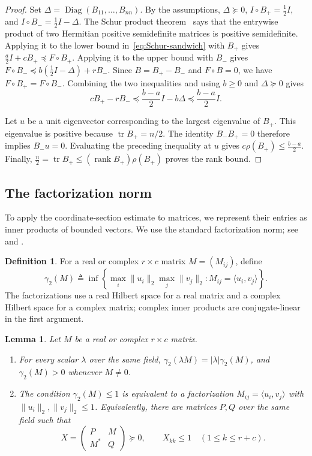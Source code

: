 \documentclass[11pt]{article}
\numberwithin{equation}{section}
\newtheorem{lemma}[theorem]{Lemma}
\theoremstyle{definition}
\newtheorem{definition}[theorem]{Definition}
\theoremstyle{remark}
\DeclareMathOperator{\tr}{tr}
\DeclareMathOperator{\rank}{rank}
\DeclareMathOperator{\Diag}{Diag}
\begin{document}
\begin{proof}
Set
$\Delta=\Diag(B_{11},\ldots,B_{nn})$.
By the assumptions,
$\Delta\succeq0$, $I\circ B_+=\frac12 I$, and $I\circ B_-=\frac12 I-\Delta$.
The Schur product theorem~\cite{Schur} says that the entrywise
product of two Hermitian positive semidefinite matrices is
positive semidefinite. Applying it to the lower bound
in~\eqref{eq:Schur-sandwich} with $B_+$ gives
$\frac a2 I+cB_+\preceq F\circ B_+$.
Applying it to the upper bound with $B_-$ gives
$F\circ B_-\preceq b\left(\frac12 I-\Delta\right)+rB_-$.
Since $B=B_+-B_-$ and $F\circ B=0$, we have
$F\circ B_+=F\circ B_-$.
Combining the two inequalities and using $b\geq0$ and $\Delta\succeq0$
gives
\[
 cB_+-rB_-
 \preceq \frac{b-a}{2}I-b\Delta
 \preceq \frac{b-a}{2}I.
\]

Let $u$ be a unit eigenvector corresponding to the largest
eigenvalue of $B_+$. This eigenvalue is positive because
$\tr B_+=n/2$.
The identity $B_-B_+=0$ therefore implies $B_-u=0$.
Evaluating the preceding inequality at $u$ gives
$c\rho(B_+)\leq\frac{b-a}{2}$.
Finally,
$\frac n2=\tr B_+ \leq(\rank B_+)\rho(B_+)$
proves the rank bound.
\end{proof}


\subsection{The factorization norm}\label{sec:factorization}

To apply the coordinate-section estimate to matrices, we represent
their entries as inner products of bounded vectors. We use the
standard factorization norm; see \cite[Section~2, equation~(2)]{SS05}
and \cite[Section~2.1]{LMSS}.

\begin{definition}\label{def:gamma-two}
For a real or complex $r\times c$ matrix $M=(M_{ij})$, define
\[
 \gamma_2(M)\triangleq \inf\left\{
  \max_i\|u_i\|_2\max_j\|v_j\|_2:
  M_{ij}=\langle u_i,v_j\rangle\right\}.
\]
The factorizations use a real Hilbert space for a real matrix and a
complex Hilbert space for a complex matrix; complex inner products
are conjugate-linear in the first argument.
\end{definition}

\begin{lemma}\label{lem:gamma-properties}
Let $M$ be a real or complex $r\times c$ matrix.
\begin{enumerate}
\item For every scalar $\lambda$ over the same field,
$\gamma_2(\lambda M)=|\lambda|\gamma_2(M)$, and
$\gamma_2(M)>0$ whenever $M\ne0$.
\item The condition $\gamma_2(M)\leq1$ is equivalent to a
factorization $M_{ij}=\langle u_i,v_j\rangle$ with
$\|u_i\|_2,\|v_j\|_2\leq1$.
Equivalently, there are matrices $P,Q$ over the same field such that
\[
 X=\begin{pmatrix}P&M\\M^*&Q\end{pmatrix}\succeq0,
 \qquad X_{kk}\leq1\quad(1\leq k\leq r+c).
\]
\end{enumerate}
\end{lemma}
\end{document}
